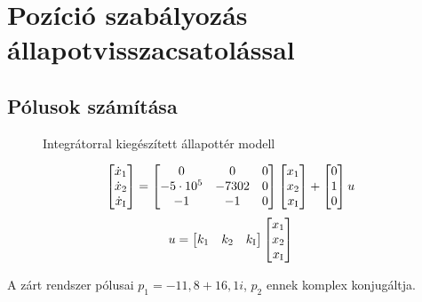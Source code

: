 \section{Pozíció szabályozás állapotvisszacsatolással}

\subsection{Pólusok számítása}

\begin{figure}[H]
    \centering
	\caption{Integrátorral kiegészített állapottér modell}
	\label{fig:6a_allapotter_hatasvazlat_jav}
\end{figure}

\begin{equation}
	\begin{bmatrix}\dot{x}_1\\\dot{x}_2\\ \dot{x}_\text{I}\end{bmatrix} =
	\begin{bmatrix}0&0&0\\-5\cdot10^5&-7302&0\\-1&-1&0\end{bmatrix}\begin{bmatrix}x_1\\x_2\\x_\text{I}\end{bmatrix} +
	\begin{bmatrix}0\\1\\0\end{bmatrix}u
\end{equation}
\begin{equation}
	u = \begin{bmatrix}k_1&k_2&k_\text{I}\end{bmatrix}\begin{bmatrix}x_1\\x_2\\x_\text{I}\end{bmatrix}
\end{equation}

A zárt rendszer pólusai $p_1 = -11,8 + 16,1i$, $p_2$ ennek komplex konjugáltja.

